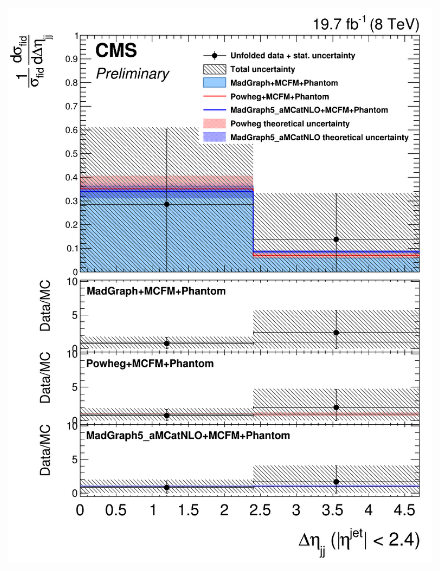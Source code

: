 \begin{figure}[hbtp]
\begin{center}
    \includegraphics[width=\cmsFigWidth]{Figures/DiffCrossSecZZTo2e2mCentralDeta_Unfolded_fr_MadGraph_norm.png}       

\end{center}
\end{figure}
